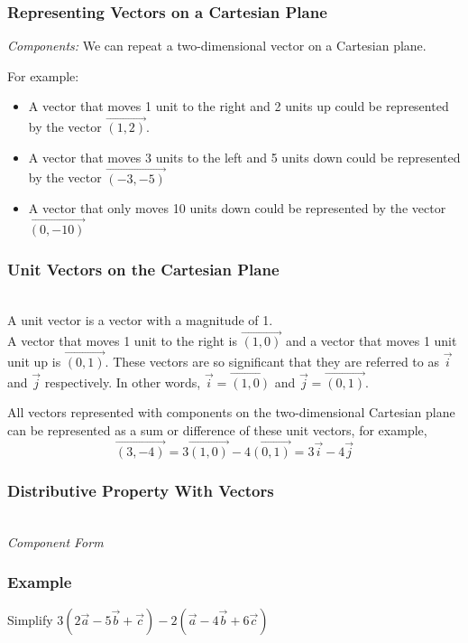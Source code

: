 \documentclass{article}
\begin{document}
\subsubsection{Representing Vectors on a Cartesian Plane}
\textit{Components: }
We can repeat a two-dimensional vector on a Cartesian plane.

For example:
\begin{itemize}
    \item A vector that moves 1 unit to the right and 2 units up could be represented by the vector $\overrightarrow{(1,2)}$.
    \item A vector that moves 3 units to the left and 5 units down could be represented by the vector $\overrightarrow{(-3,-5)}$
    \item A vector that only moves 10 units down could be represented by the vector $\overrightarrow{(0,-10)}$
\end{itemize}
\subsubsection{Unit Vectors on the Cartesian Plane}\\


A unit vector is a vector with a magnitude of 1.\\

A vector that moves 1 unit to the right is $\overrightarrow{(1,0)}$ and a vector that moves 1 unit unit up is $\overrightarrow{(0,1)}$. These vectors are so significant that they are referred to as $\vec{i}$ and $\vec{j}$ respectively. In other words, $\vec{i}=\overrightarrow{(1,0)}$ and $\vec{j}=\overrightarrow{(0,1)}$.

All vectors represented with components on the two-dimensional Cartesian plane can be represented as a sum or difference of these unit vectors, for example,\\
$$\overrightarrow{(3,-4)}=3\overrightarrow{(1,0)}-4\overrightarrow{(0,1)}=3\vec{i}-4\vec{j}$$

\subsubsection{Distributive Property With Vectors}
\\

\textit{Component Form}
\subsubsection*{Example}
Simplify $3(2\vec{a}-5\vec{b}+\vec{c})-2(\vec{a}-4\vec{b}+6\vec{c})$
\end{document}
